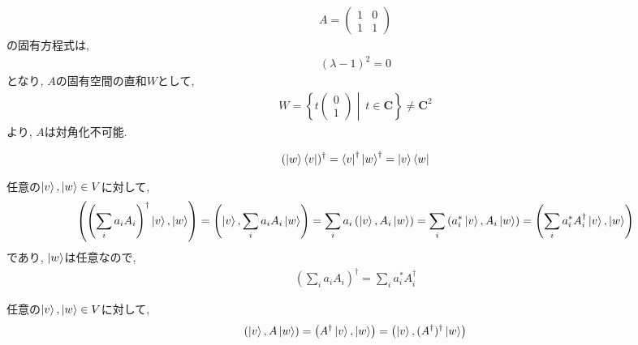 \begin{ex}
    \label{ex2.12}
    \begin{align*}
        A =
        \begin{pmatrix}
            1 & 0 \\
            1 & 1
        \end{pmatrix}
    \end{align*}
    の固有方程式は,
    \begin{align*}
        (\lambda-1)^2=0
    \end{align*}
    となり, $A$の固有空間の直和$W$として,
    \begin{align*}
        W =
        \left\{
        t
        \begin{pmatrix}
            0 \\1
        \end{pmatrix}
        \middle| \ t \in \bm{C}
        \right\}
        \neq \bm{C}^2
    \end{align*}
    より, $A$は対角化不可能.
\end{ex}

\begin{ex}
    \label{ex2.13}
    \begin{align*}
        (\ket{w} \bra{v})^\dagger = \bra{v}^\dagger \ket{w}^\dagger = \ket{v} \bra{w}
    \end{align*}
\end{ex}

\begin{ex}
    \label{ex2.14}
    任意の$\ket{v},\ket{w} \in V$に対して,
    \begin{align*}
        \left(\left(\sum_i a_i A_i \right)^\dagger
        \ket{v}, \ket{w} \right)
        =
        \left(\ket{v}, \sum_i a_i A_i \ket{w} \right)
        =
        \sum_i a_i\left(\ket{v},  A_i \ket{w} \right)
        =
        \sum_i \left( a_i^* \ket{v},  A_i \ket{w} \right)
        =
        \left(\sum_i a_i^* A_i^\dagger \ket{v},  \ket{w} \right)
    \end{align*}
    であり, $\ket{w}$は任意なので,
    \begin{align*}
        \left(\sum_i a_i A_i \right)^\dagger = \sum_i a_i^* A_i^\dagger
    \end{align*}
\end{ex}

\begin{ex}
    \label{ex2.15}
    任意の$\ket{v},\ket{w} \in V$に対して,
    \begin{align*}
        \left(\ket{v}, A \ket{w} \right)
        =
        \left(A^\dagger \ket{v}, \ket{w} \right)
        =
        \left(\ket{v}, (A^\dagger)^\dagger \ket{w} \right)
    \end{align*}
\end{ex}

